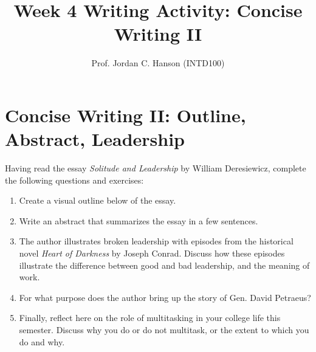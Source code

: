 \documentclass{article}
\begin{document}
\title{Week 4 Writing Activity: Concise Writing II}
\author{Prof. Jordan C. Hanson (INTD100)}

\maketitle

\section{Concise Writing II: Outline, Abstract, Leadership}

Having read the essay \textit{Solitude and Leadership} by William Deresiewicz, complete the following questions and exercises:

\begin{enumerate}
\item Create a visual outline below of the essay. \\ \vspace{3cm}
\item Write an abstract that summarizes the essay in a few sentences. \\ \vspace{2cm}
\item The author illustrates broken leadership with episodes from the historical novel \textit{Heart of Darkness} by Joseph Conrad.  Discuss how these episodes illustrate the difference between good and bad leadership, and the meaning of work. \\ \vspace{3cm}
\item For what purpose does the author bring up the story of Gen. David Petraeus? \\ \vspace{2cm}
\item Finally, reflect here on the role of multitasking in your college life this semester.  Discuss why you do or do not multitask, or the extent to which you do and why.
\end{enumerate}
\end{document}
